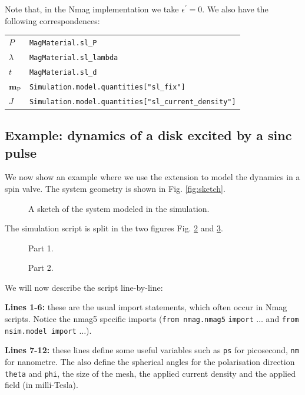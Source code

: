 \documentclass[11pt,oneside,openany]{article}
\newcommand{\vecs}[2]{\mathbf{#1_{\mathrm{#2}}}}
\begin{document}
Note that, in the Nmag implementation we take $\epsilon^\prime = 0$.
We also have the following correspondences:

\begin{tabular}{ll}
$P$ & \verb|MagMaterial.sl_P| \\
$\lambda$ & \verb|MagMaterial.sl_lambda| \\
$t$ & \verb|MagMaterial.sl_d| \\
$\vecs{m}{P}$ & \verb|Simulation.model.quantities["sl_fix"]| \\
$J$ & \verb|Simulation.model.quantities["sl_current_density"]| \\
\end{tabular}

\subsection{Example: dynamics of a disk excited by a sinc pulse}
We now show an example where we use the extension to model the dynamics
in a spin valve.
The system geometry is shown in Fig. \ref{fig:sketch}.
%
\begin{figure}[h]
\begin{center}
\caption[Sketch]{A sketch of the system modeled in the simulation.}
\label{fig:mesh}
\end{center}
\end{figure}
%
The simulation script is split in the two figures Fig. \ref{fig:script1of2} and
\ref{fig:script2of2}. 

\begin{figure}[!p]

\caption{Part 1.}
\label{fig:script1of2}
\end{figure}

\begin{figure}[!h]

\caption{Part 2.}
\label{fig:script2of2}
\end{figure}

We will now describe the script line-by-line:

\textbf{Lines 1-6:} these are the usual import statements, which often occur
in Nmag scripts. Notice the nmag5 specific imports (\verb|from nmag.nmag5|
\verb|import| $\ldots$ and \verb|from| \verb|nsim.model import| $\ldots$).

\textbf{Lines 7-12:} these lines define some useful variables such as
\verb|ps| for picosecond, \verb|nm| for nanometre.  The also define the
spherical angles for the polarisation direction \verb|theta| and \verb|phi|,
the size of the mesh, the applied current density and the applied field
(in milli-Tesla).
\end{document}
